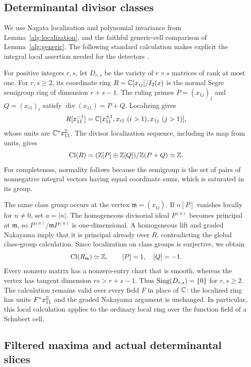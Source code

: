 \subsection{Determinantal divisor classes}\label{ta:determinantal}

We use Nagata localization and polynomial invariance from
Lemma~\ref{alg:localization}, and the faithful generic-cell comparison
of Lemma~\ref{alg:generic}. The following standard calculation makes
explicit the integral local assertion needed for the detectors
\cite{Fos73,BV88}.

For positive integers $r,s$, let $D_{r,s}$ be the variety of $r\times s$
matrices of rank at most one. For $r,s\geq2$, its coordinate ring
$R=\mathbb C[x_{ij}]/I_2(x)$ is the normal Segre semigroup ring of dimension
$r+s-1$. The ruling primes $P=(x_{1j})_j$ and $Q=(x_{i1})_i$ satisfy
$\operatorname{div}(x_{11})=P+Q$. Localizing gives
\[
 R[x_{11}^{-1}]
 =\mathbb C[x_{11}^{\pm1},x_{i1}\ (i>1),x_{1j}\ (j>1)],
\]
whose units are $\mathbb C^*x_{11}^{\mathbb Z}$. The divisor localization sequence,
including its map from units, gives
\[
 \operatorname{Cl}(R)=(\mathbb Z[P]\oplus\mathbb Z[Q])/\mathbb Z(P+Q)\simeq\mathbb Z.
\]
For completeness, normality follows because the semigroup is the set
of pairs of nonnegative integral vectors having equal coordinate sums,
which is saturated in its group.

The same class group occurs at the vertex $\mathfrak m=(x_{ij})$.
If $n[P]$ vanishes locally for $n\neq0$, set $a=|n|$.
The homogeneous divisorial ideal $P^{(a)}$ becomes principal at
$\mathfrak m$, so $P^{(a)}/\mathfrak mP^{(a)}$ is one-dimensional.
A homogeneous lift and graded Nakayama imply that it is principal
already over $R$, contradicting the global class-group calculation.
Since localization on class groups is surjective, we obtain
\[
 \operatorname{Cl}(R_{\mathfrak m})\simeq\mathbb Z,\qquad [P]=1,\quad [Q]=-1.
\]
Every nonzero matrix has a nonzero-entry chart that is smooth, whereas
the vertex has tangent dimension $rs>r+s-1$. Thus
$\operatorname{Sing}(D_{r,s})=\{0\}$ for $r,s\geq2$.
The calculation remains valid over every field $F$ in place of $\mathbb C$:
the localized ring has units $F^*x_{11}^{\mathbb Z}$ and the graded Nakayama
argument is unchanged. In particular, this local calculation applies
to the ordinary local ring over the function field of a Schubert cell.

\subsection{Filtered maxima and actual determinantal slices}

